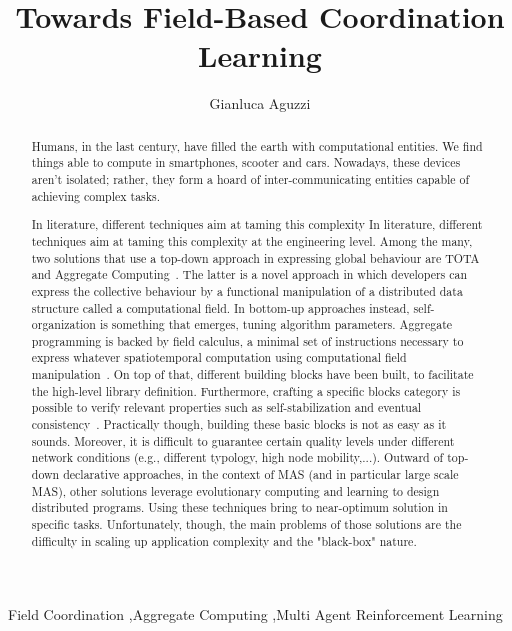 \documentclass[3p]{elsarticle}
\begin{document}
\begin{frontmatter}

\title{Towards Field-Based Coordination Learning} %


\author{Gianluca Aguzzi}
\address{\texttt{gianluca.aguzzi@unibo.it}}
\begin{abstract}
Humans, in the last century, have filled the earth with computational entities. 
%
We find things able to compute in smartphones, scooter and cars. %
Nowadays, these devices aren't isolated; rather, they form a hoard of inter-communicating entities capable of achieving complex tasks.

In literature, different techniques aim at taming this complexity In literature, different techniques aim at taming this complexity at the engineering level.
%
Among the many, two solutions that use a top-down approach in expressing global behaviour are TOTA~\cite{DBLP:journals/tosem/MameiZ09} and Aggregate Computing~\cite{DBLP:journals/computer/BealPV15}.
%
The latter is a novel approach in which developers can express the collective behaviour by 
a functional manipulation of a distributed data structure called a computational field.
%
In bottom-up approaches instead, self-organization is something that emerges, tuning algorithm parameters.
%
Aggregate programming is backed by field calculus, a minimal set of instructions necessary to express whatever spatiotemporal computation using computational field manipulation~\cite{DBLP:conf/coordination/AudritoBDV18}. 
%
On top of that, different building blocks have been built, to facilitate the high-level library definition.
%
Furthermore, crafting a specific blocks category is possible to verify relevant properties such as self-stabilization \cite{DBLP:conf/coordination/ViroliD14} and eventual consistency~\cite{DBLP:conf/saso/BealVPD16}.
%
Practically though, building these basic blocks is not as easy as it sounds. Moreover, it is difficult to guarantee certain quality levels under different network conditions (e.g., different typology, high node mobility,...).
%
Outward of top-down declarative approaches, in the context of MAS (and in particular large scale MAS), other solutions leverage evolutionary computing and learning to design distributed programs. Using these techniques bring to near-optimum solution in specific tasks. 
Unfortunately, though, the main problems of those solutions are the difficulty in scaling up application complexity and the "black-box" nature.
%
\end{abstract}
\begin{keyword}
Field Coordination \sep Aggregate Computing \sep Multi Agent Reinforcement Learning
\end{keyword}

\end{frontmatter}


\end{document}
